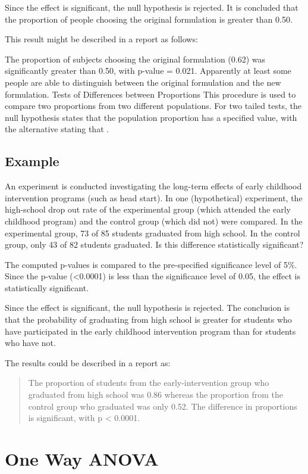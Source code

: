 \documentclass[12pt, a4paper]{report}
\begin{document}
Since the effect is significant, the null hypothesis is rejected. It is concluded that the proportion of people choosing the original formulation is greater than 0.50.

This result might be described in a report as follows:

    The proportion of subjects choosing the original formulation (0.62) was significantly greater than 0.50, with p-value = 0.021.
    Apparently at least some people are able to distinguish between the original formulation and the new formulation.
Tests of Differences between Proportions
This procedure is used to compare two proportions from two different populations. For two tailed tests, the null hypothesis states that the population proportion  has a specified value, with the alternative stating that .

\subsection{Example}
An experiment is conducted investigating the long-term effects of early childhood intervention programs (such as head start). In one (hypothetical) experiment, the high-school drop out rate of the experimental group (which attended the early childhood program) and the control group (which did not) were compared. In the experimental group, 73 of 85 students graduated from high school. In the control group, only 43 of 82 students graduated. Is this difference statistically significant?

The computed p-values is compared to the pre-specified significance level of 5\%. Since the p-value (<0.0001) is less than the significance level of 0.05, the effect is statistically significant.

Since the effect is significant, the null hypothesis is rejected. The conclusion is that the probability of graduating from high school is greater for students who have participated in the early childhood intervention program than for students who have not.

The results could be described in a report as:
\begin{quote}
The proportion of students from the early-intervention group who graduated from high school was 0.86 whereas the proportion from the control group who graduated was only 0.52. The difference in proportions is significant, with p < 0.0001.
\end{quote}

\section{One Way ANOVA}
\end{document}
